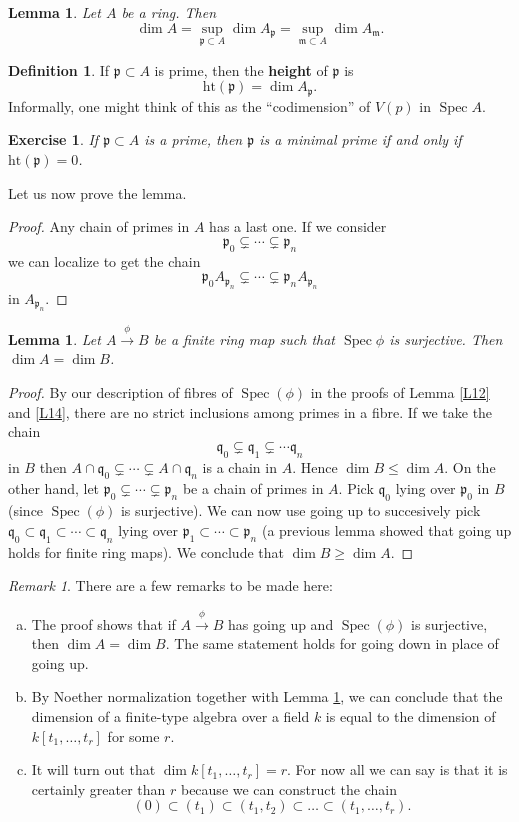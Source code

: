 \documentclass{article}
\newcommand{\fr}{\mathfrak}
\DeclareMathOperator{\Spec}{Spec}
\theoremstyle{plain}
\newtheorem{lem}[thm]{Lemma}
\newtheorem{exc}{Exercise}
\theoremstyle{definition}
\newtheorem{defn}{Definition}
\theoremstyle{remark}
\newtheorem*{rem}{Remark}
\begin{document}
\begin{lem}
\label{L28}
Let $A$ be a ring. Then
\[\dim A=\sup_{\fr p\subset A}\dim A_\fr p=\sup_{\fr m\subset A}\dim A_\fr m.\]
\end{lem}

\begin{defn}
If $\fr p\subset A$ is prime, then the \textbf{height} of $\fr p$ is
\[\text{ht}(\fr p)=\dim A_\fr p.\]
Informally, one might think of this as the ``codimension'' of $V(p)$ in $\Spec A$.
\end{defn}

\begin{exc}
If $\fr p\subset A$ is a prime, then $\fr p$ is a minimal prime if and only if $\text{ht}(\fr p)=0$.
\end{exc}

Let us now prove the lemma.
\begin{proof}
Any chain of primes in $A$ has a last one. If we consider
\[\fr p_0\subsetneq\cdots\subsetneq\fr p_n\]
we can localize to get the chain
\[\fr p_0A_{\fr p_n}\subsetneq\cdots\subsetneq\fr p_nA_{\fr p_n}\]
in $A_{\fr p_n}$.
\end{proof}


\begin{lem}
\label{L29}
Let $A\overset{\phi}{\to}B$ be a finite ring map such that $\Spec \phi$ is surjective. Then $\dim A=\dim B$.
\end{lem}
\begin{proof}
By our description of fibres of $\Spec(\phi)$ in the proofs of Lemma \ref{L12} and \ref{L14}, there are no strict inclusions among primes in a fibre. If we take the chain
\[\fr q_0\subsetneq\fr q_1\subsetneq\cdots\fr q_n\]
in $B$ then $A\cap\fr q_0\subsetneq\cdots\subsetneq A\cap\fr q_n$ is a chain in $A$. Hence $\dim B\leq\dim A$. On the other hand, let $\fr p_0\subsetneq\cdots\subsetneq\fr p_n$ be a chain of primes in $A$. Pick $\fr q_0$ lying over $\fr p_0$ in $B$ (since $\Spec(\phi)$ is surjective). We can now use going up to succesively pick $\fr q_0\subset\fr q_1\subset\cdots\subset\fr q_n$ lying over $\fr p_1\subset\cdots\subset\fr p_n$ (a previous lemma showed that going up holds for finite ring maps). We conclude that $\dim B\geq\dim A$.
\end{proof}

\begin{rem}
There are a few remarks to be made here:
\begin{enumerate}[(a)]
\item The proof shows that if $A\overset{\phi}{\to}B$ has going up and $\Spec(\phi)$ is surjective, then $\dim A=\dim B$. The same statement holds for going down in place of going up.
\item By Noether normalization together with Lemma \ref{L29}, we can conclude that the dimension of a finite-type algebra over a field $k$ is equal to the dimension of $k[t_1,\ldots, t_r]$ for some $r$.
\item It will turn out that $\dim k[t_1,\ldots, t_r]=r$. For now all we can say is that it is certainly greater than $r$ because we can construct the chain
\[(0)\subset(t_1)\subset(t_1,t_2)\subset\ldots\subset(t_1,\ldots,t_r).\]
\end{enumerate}
\end{rem}
\end{document}
